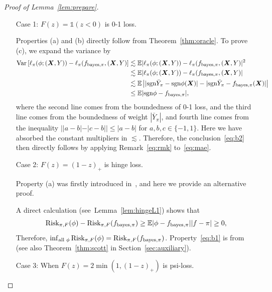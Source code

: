 \documentclass[11pt]{article}
\theoremstyle{plain}
\theoremstyle{definition}
\def\sign{\textup{sgn}}
\def\bayespif{f_{\textup{bayes},\pi}}
\def\shift{\bar Y_\pi}
\def\riskF{\textup{Risk}_{\pi,F}}
\begin{document}
\begin{proof}[Proof of Lemma~\ref{lem:prepare}]
\begin{enumerate}[label={2.\arabic*},wide, labelwidth=!, labelindent=0pt]

\item[Case 1:] $F(z)=\mathds{1}(z<0)$ is 0-1 loss. 

Properties (a) and (b) directly follow from Theorem~\ref{thm:oracle}. To prove (c), we expand the variance by
\begin{align}\label{eq:mae}
\textup{Var}\left[\ell_{\pi}(\phi;(\mX,Y))-\ell_{\pi}(\bayespif,(\mX,Y)\right] &\lesssim \mathbb{E}|\ell_{\pi}(\phi;(\mX,Y))-\ell_{\pi}(\bayespif,(\mX,Y)|^2\notag \\
&\lesssim \mathbb{E}|\ell_{\pi}(\phi;(\mX,Y))-\ell_{\pi}(\bayespif,(\mX,Y)|\notag \\
& \lesssim \mathbb{E}\left||\sign \shift - \sign \phi(\mX)|-|\sign \shift -\bayespif(\mX)|\right|\notag\\
&\leq \mathbb{E}|\sign \phi-\bayespif|,
\end{align}
where the second line comes from the boundedness of 0-1 loss, and the third line comes from the boundedness of weight $|\shift|$, and fourth line comes from the inequality $||a-b|-|c-b||\leq |a-b|$ for $a,b,c\in\{-1,1\}$. Here we have absorbed the constant multipliers in $\lesssim$. Therefore, the conclusion~\eqref{eq:b2} then directly follows by applying Remark~\ref{eq:rmk} to~\eqref{eq:mae}. 

\item[Case 2:] $F(z)=(1-z)_{+}$ is hinge loss. 

Property (a) was firstly introduced in~\citet[Lemma 1]{wang2008probability}, and here we provide an alternative proof. 

A direct calculation (see\ Lemma~\ref{lem:hingeL1}) shows that
\[
\riskF(\phi)-\riskF(\bayespif)\geq \mathbb{E}|\phi-\bayespif||f-\pi|\geq0,
\]
Therefore, $\inf_{\text{all }\phi}\riskF(\phi)=\riskF(\bayespif)$. Property~\eqref{eq:b1} is from \citet[Corollary 1]{scott2011surrogate} (see also Theorem~\ref{thm:scott} in Section~\ref{sec:auxiliary}).

\item[Case 3:] When $F(z) = 2\min(1,(1-z)_+)$ is psi-loss. 


\end{enumerate}
\end{proof}
\end{document}
